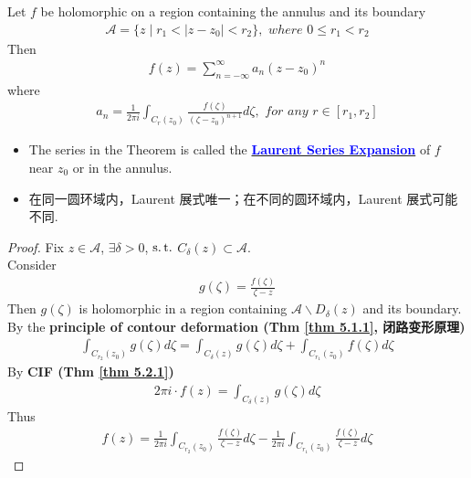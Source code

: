 	\begin{thm}\label{thm 7.2.1}
		Let $f$ be holomorphic on a region containing the annulus and its boundary
		\begin{align}
			\mathcal{A} = \{ z \mid r_1 < \left| z - z_0 \right| < r_2 \}, \,\, where \,\, 0 \leq r_1 < r_2
		\end{align}
		Then
		\begin{align}
			f(z) = \sum_{n = -\infty}^{\infty}{a_n (z - z_0)^n}
		\end{align}
		where
		\begin{align}
			a_n = \frac{1}{2\pi i} \int_{C_{r}(z_0)}{\frac{f(\zeta)}{(\zeta - z_0)^{n + 1}} d\zeta} , \,\, for \,\, any \,\, r \in [r_1 , r_2]
		\end{align}
	
		\vspace{1em}
		\begin{rmk}
			\begin{itemize}
				\item The series in the Theorem is called the \underline{\textcolor{blue}{\textbf{Laurent Series Expansion}}} of $f$ near $z_0$ or in the annulus.
				
				\vspace{1em}
				
				\item 在同一圆环域内，Laurent 展式唯一；在不同的圆环域内，Laurent 展式可能不同.
			\end{itemize}
		\end{rmk}
	
		\vspace{1em}
		\begin{proof}
			Fix $z \in \mathcal{A}$, $\exists \delta > 0$, $\operatorname{s.t.}$ $C_{\delta}(z) \subset \mathcal{A}$. \\
			Consider 
			\begin{align}
				g(\zeta) = \frac{f(\zeta)}{\zeta - z}
			\end{align}
			Then $g(\zeta)$ is holomorphic in a region containing $\mathcal{A} \backslash D_{\delta}(z)$ and its boundary. \\
			By the \textbf{principle of contour deformation (Thm \ref{thm 5.1.1}, 闭路变形原理)}
			\begin{align}
				\int_{C_{r_2}(z_0)}{g(\zeta) d\zeta} = \int_{C_{\delta}(z)}{g(\zeta) d\zeta} + \int_{C_{r_1}(z_0)}{f(\zeta) d\zeta}
			\end{align}
			By \textbf{CIF (Thm \ref{thm 5.2.1})}
			\begin{align}
				2 \pi i \cdot f(z) = \int_{C_{\delta}(z)}{g(\zeta) d\zeta}
			\end{align}
			Thus
			\begin{align}
				f(z) = \frac{1}{2 \pi i} \int_{C_{r_2}(z_0)}{\frac{f(\zeta)}{\zeta - z} d\zeta} - \frac{1}{2 \pi i} \int_{C_{r_1}(z_0)}{\frac{f(\zeta)}{\zeta - z} d\zeta}
			\end{align}
		

\end{proof}
\end{thm}
